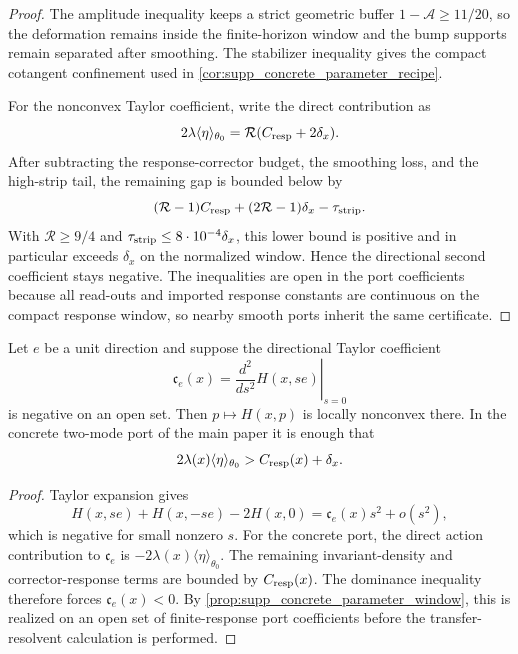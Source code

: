 \begin{proof}
The amplitude inequality keeps a strict geometric buffer
\(1-\mathcal A\ge11/20\), so the deformation remains inside the finite-horizon
window and the bump supports remain separated after smoothing.  The
stabilizer inequality gives the compact cotangent confinement used in
\cref{cor:supp_concrete_parameter_recipe}.

For the nonconvex Taylor coefficient, write the direct contribution as
\[
  2\lambda\langle\eta\rangle_{\theta_0}
  =\mathcal R(C_{\rm resp}+2\delta_x).
\]
After subtracting the response-corrector budget, the smoothing loss, and the
high-strip tail, the remaining gap is bounded below by
\[
  (\mathcal R-1)C_{\rm resp}+(2\mathcal R-1)\delta_x-\tau_{\rm strip}.
\]
With \(\mathcal R\ge9/4\) and
\(\tau_{\rm strip}\le 8\cdot10^{-4}\delta_x\), this lower bound is positive
and in particular exceeds \(\delta_x\) on the normalized window.  Hence the
directional second coefficient stays negative.  The inequalities are open in
the port coefficients because all read-outs and imported response constants
are continuous on the compact response window, so nearby smooth ports inherit
the same certificate.
\end{proof}

\begin{lemma}
\label{lem:supp_directional_nonconvexity}
Let \(e\) be a unit direction and suppose the directional Taylor coefficient
\[
  \mathfrak c_e(x)
  =
  \left.\frac{d^2}{ds^2}H(x,se)\right|_{s=0}
\]
is negative on an open set.  Then \(p\mapsto H(x,p)\) is locally nonconvex
there.  In the concrete two-mode port of the main paper it is enough that
\[
  2\lambda(x)\langle\eta\rangle_{\theta_0}
  >
  C_{\rm resp}(x)+\delta_x .
\]
\end{lemma}

\begin{proof}
Taylor expansion gives
\[
  H(x,se)+H(x,-se)-2H(x,0)
  =
  \mathfrak c_e(x)s^2+o(s^2),
\]
which is negative for small nonzero \(s\).  For the concrete port, the direct
action contribution to \(\mathfrak c_e\) is
\(-2\lambda(x)\langle\eta\rangle_{\theta_0}\).  The remaining invariant-density
and corrector-response terms are bounded by \(C_{\rm resp}(x)\).  The
dominance inequality therefore forces \(\mathfrak c_e(x)<0\).  By
\cref{prop:supp_concrete_parameter_window}, this is realized on an open set of
finite-response port coefficients before the transfer-resolvent calculation is
performed.
\end{proof}

